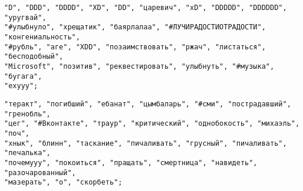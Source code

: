 
\begin{lstlisting}[caption="Эмоционально положительные термы"]
"D", "DDD", "DDDD", "XD", "DD", "царевич", "xD", "DDDDD", "DDDDDD", "уругвай",
"#улыбнуло", "хрещатик", "баярлалаа", "#ЛУЧИРАДОСТИОТРАДОСТИ", "конгениальность",
"#рубль", "аге", "XDD", "позаимствовать", "ржач", "листаться", "бесподобный",
"Microsoft", "позитив", "реквестировать", "улыбнуть", "#музыка", "бугага",
"ехууу";
\end{lstlisting}

\begin{lstlisting}[caption="Эмоционально негативные термы"]
"теракт", "погибший", "ебанат", "цымбаларь", "#сми", "пострадавший", "гренобль",
"цег", "#Вконтакте", "траур", "критический", "однобокость", "михаэль", "поч",
"хнык", "блинн", "таскание", "пичаливать", "грусный", "пичаливать", "печалька",
"почемууу", "покоиться", "пращать", "смертница", "навидеть", "разочарованный",
"мазерать", "о", "скорбеть";
\end{lstlisting}
